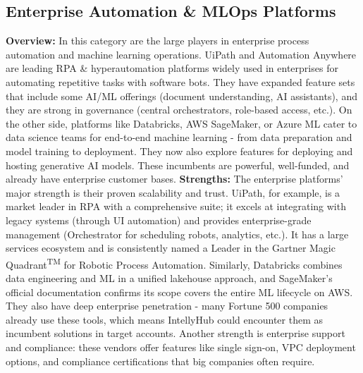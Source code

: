 \documentclass[11pt, a4paper, oneside]{article}
\begin{document}
\subsection{Enterprise Automation \& MLOps Platforms}
\textbf{Overview:} In this category are the large players in enterprise process automation and machine learning operations. UiPath and Automation Anywhere are leading RPA \& hyperautomation platforms widely used in enterprises for automating repetitive tasks with software bots. They have expanded feature sets that include some AI/ML offerings (document understanding, AI assistants), and they are strong in governance (central orchestrators, role-based access, etc.). On the other side, platforms like Databricks, AWS SageMaker, or Azure ML cater to data science teams for end-to-end machine learning - from data preparation and model training to deployment. They now also explore features for deploying and hosting generative AI models. These incumbents are powerful, well-funded, and already have enterprise customer bases.
\newline\newline
\textbf{Strengths:} The enterprise platforms' major strength is their proven scalability and trust. UiPath, for example, is a market leader in RPA with a comprehensive suite; it excels at integrating with legacy systems (through UI automation) and provides enterprise-grade management (Orchestrator for scheduling robots, analytics, etc.). It has a large services ecosystem and is consistently named a Leader in the Gartner\textsuperscript{\textregistered} Magic Quadrant\textsuperscript{TM} for Robotic Process Automation\cite{uipathGartner}. Similarly, Databricks combines data engineering and ML in a unified lakehouse approach, and SageMaker's official documentation confirms its scope covers the entire ML lifecycle on AWS\cite{awsSagemaker}. They also have deep enterprise penetration - many Fortune 500 companies already use these tools, which means IntellyHub could encounter them as incumbent solutions in target accounts. Another strength is enterprise support and compliance: these vendors offer features like single sign-on, VPC deployment options, and compliance certifications that big companies often require.
\newline\newline
\end{document}

